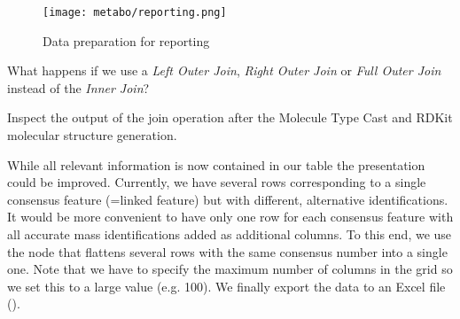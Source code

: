 \begin{figure}[htbp]
  \centering
  \texttt{[image: metabo/reporting.png]}
  \caption{Data preparation for reporting}
  \label{fig:reporting}
\end{figure}

\begin{question}
What happens if we use a \textit{Left Outer Join}, \textit{Right Outer Join} or \textit{Full Outer Join} instead of the \textit{Inner Join}?
\end{question}

\begin{task}
Inspect the output of the join operation after the Molecule Type Cast and RDKit molecular structure generation.
\end{task}

While all relevant information is now contained in our table the presentation could be improved.
Currently, we have several rows corresponding to a single consensus feature (=linked feature) but with different, alternative identifications.
It would be more convenient to have only one row for each consensus feature with all accurate mass identifications added as additional columns.
To this end, we use the  node that flattens several rows with the same consensus number into a single one.
Note that we have to specify the maximum number of columns in the grid so we set this to a large value (e.g. 100).
We finally export the data to an Excel file ().

